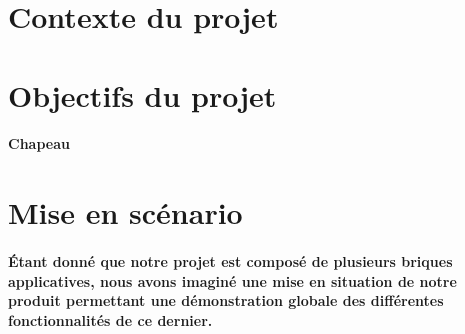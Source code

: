 \section{Contexte du projet} \label{sec:introduction}


\section{Objectifs du projet} \label{sec:objectifs}
\paragraph{Chapeau}

\section{Mise en scénario} \label{sec:miseEnScenario}

\paragraph{
	Étant donné que notre projet est composé de plusieurs briques applicatives, 
nous avons imaginé une mise en situation de notre produit permettant une 
démonstration globale des différentes fonctionnalités de ce dernier.} \hfill


